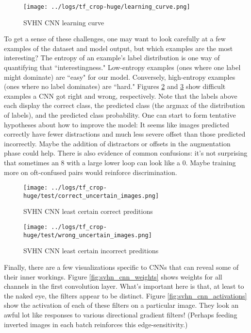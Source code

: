 \documentclass{article}
\begin{document}
\begin{figure}[htbp]
  \centering
  \texttt{[image: ../logs/tf\_crop-huge/learning\_curve.png]}
  \caption{SVHN CNN learning curve}
  \label{fig:svhn_cnn_lc}
\end{figure}

To get a sense of these challenges, one may want to look carefully at a few examples of the dataset and model output, but which examples are the most interesting? The entropy of an example's label distribution is one way of quantifying that ``interestingness." Low-entropy examples (ones where one label might dominate) are ``easy" for our model. Conversely, high-entropy examples (ones where no label dominates) are ``hard." Figures \ref{fig:svhn_cnn_correct_uncertain_images} and \ref{fig:svhn_cnn_wrong_uncertain_images} show difficult examples a CNN got right and wrong, respectively.  Note that the labels above each display the correct class, the predicted class (the argmax of the distribution of labels), and the predicted class probability. One can start to form tentative hypotheses about how to improve the model: It seems like images predicted correctly have fewer distractions and much less severe offset than those predicted incorrectly. Maybe the addition of distractors or offsets in the augmentation phase could help. There is also evidence of common confusions: it's not surprising that sometimes an 8 with a large lower loop can look like a 0. Maybe training more on oft-confused pairs would reinforce discrimination.

\begin{figure}[htbp]
  \centering
  \texttt{[image: ../logs/tf\_crop-huge/test/correct\_uncertain\_images.png]}
  \caption{SVHN CNN least certain correct preditions}
  \label{fig:svhn_cnn_correct_uncertain_images}
\end{figure}

\begin{figure}[htbp]
  \centering
  \texttt{[image: ../logs/tf\_crop-huge/test/wrong\_uncertain\_images.png]}
  \caption{SVHN CNN least certain incorrect preditions}
  \label{fig:svhn_cnn_wrong_uncertain_images}
\end{figure}

Finally, there are a few visualizations specific to CNNs that can reveal some of their inner workings. Figure \ref{fig:svhn_cnn_weights} shows weights for all channels in the first convolution layer. What's important here is that, at least to the naked eye, the filters appear to be distinct. Figure \ref{fig:svhn_cnn_activations} show the activation of each of these filters on a particular image. They look an awful lot like responses to various directional gradient filters! (Perhaps feeding inverted images in each batch reinforces this edge-sensitivity.)
\end{document}
